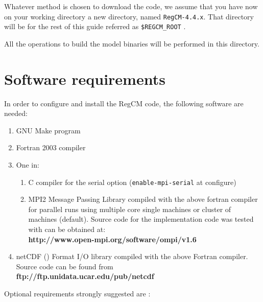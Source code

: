 %
%

Whatever method is chosen to download the code, we assume that you have now
on your working directory a new directory, named \verb=RegCM-4.4.x=.
That directory will be for the rest of this guide referred as 
\verb=$REGCM_ROOT= .

All the operations to build the model binaries will be performed in this
directory.

\section{Software requirements}

In order to configure and install the RegCM code, the following software are
needed:

\begin{enumerate}
\item GNU Make program
\item Fortran 2003 compiler
\item One in:
  \begin{enumerate}
    \item C compiler for the serial option (\verb=enable-mpi-serial= at
      configure)
    \item MPI2 Message Passing Library compiled with the above fortran compiler
     for parallel runs using multiple core single machines or cluster of
     machines (default).  Source code for the implementation code was tested
     with can be obtained at: \\
     {\bf http://www.open-mpi.org/software/ompi/v1.6}
  \end{enumerate}
\item netCDF (\cite{Rew_90}) Format I/O library compiled with the above
  Fortran compiler.  Source code can be found from \\
  {\bf ftp://ftp.unidata.ucar.edu/pub/netcdf} \\
\end{enumerate}

Optional requirements strongly suggested are :

